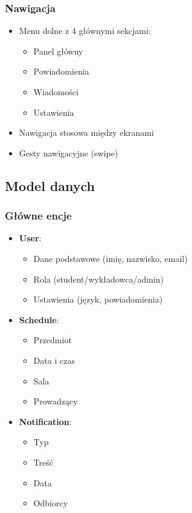 \subsubsection{Nawigacja}
\begin{itemize}
  \item Menu dolne z 4 głównymi sekcjami:
        \begin{itemize}
          \item Panel główny
          \item Powiadomienia
          \item Wiadomości
          \item Ustawienia
        \end{itemize}
  \item Nawigacja stosowa między ekranami
  \item Gesty nawigacyjne (swipe)
\end{itemize}

\subsection{Model danych}

\subsubsection{Główne encje}
\begin{itemize}
  \item \textbf{User}:
        \begin{itemize}
          \item Dane podstawowe (imię, nazwisko, email)
          \item Rola (student/wykładowca/admin)
          \item Ustawienia (język, powiadomienia)
        \end{itemize}

  \item \textbf{Schedule}:
        \begin{itemize}
          \item Przedmiot
          \item Data i czas
          \item Sala
          \item Prowadzący
        \end{itemize}

  \item \textbf{Notification}:
        \begin{itemize}
          \item Typ
          \item Treść
          \item Data
          \item Odbiorcy
        \end{itemize}
\end{itemize}

